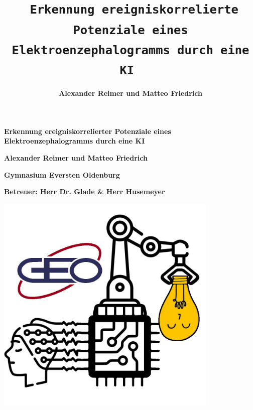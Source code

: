 \documentclass{scrartcl}
\title{\textbf{\Huge 
\texttt{
	Erkennung ereigniskorrelierte Potenziale eines Elektroenzephalogramms durch eine KI
}
} \\ \vspace{15mm}}
\date{}
\author[]{\textbf{\huge Alexander Reimer und Matteo Friedrich}}
\affil[]{\textbf{\LARGE Gymnasium Eversten Oldenburg} \\ \vspace{10mm} \textbf{\Large Betreuer: Herr Dr. Glade \& Herr Husemeyer}}
\begin{document}


	\newcommand{\sig}{\textrm{sig}}
	\newcommand{\netin}{\textrm{netzinput}}

	\newcommand{\threesub}[1]{
	\vspace{1.5ex}
	\noindent {\textbf{#1}}
	\vspace{0.5ex}
	}

	{\centering

	\vspace*{15mm}
	\textbf{\Huge 
	Erkennung ereigniskorrelierter Potenziale eines Elektroenzephalogramms durch eine KI
	}

	\vspace{15mm}

	\textbf{\huge Alexander Reimer und Matteo Friedrich}

	\vspace{1em}

	\textbf{\LARGE Gymnasium Eversten Oldenburg}

	\vspace{10mm}

	\textbf{\Large Betreuer: Herr Dr. Glade \& Herr Husemeyer}

	\vspace{20mm}

	\includegraphics[width=0.8\textwidth]{pictures/logo.png}

	}

	\newpage
	
	\tableofcontents
	
\end{document}
